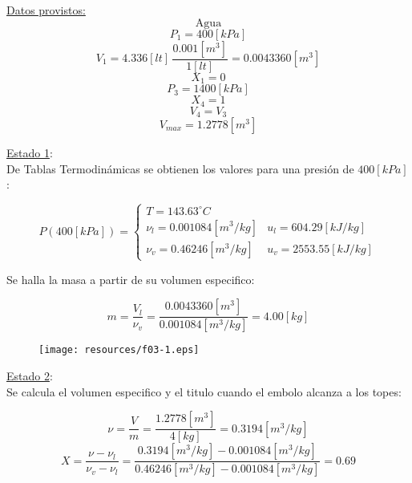 \documentclass[letter,11pt]{article}
\begin{document}
\begin{enumerate}
\underline{Datos provistos:}
\begin{equation*}
    \text{Agua}
\end{equation*}
\begin{equation*}
    P_1 = 400[kPa]
\end{equation*}
\begin{equation*}
    V_1 = 4.336[lt]\,\frac{0.001[m^3]}{1[lt]}=0.0043360[m^3]
\end{equation*}
\begin{equation*}
    X_1 = 0
\end{equation*}
\begin{equation*}
    P_3 = 1400[kPa]
\end{equation*}
\begin{equation*}
    X_4 = 1
\end{equation*}
\begin{equation*}
    V_4 = V_3
\end{equation*}
\begin{equation*}
    V_{max} = 1.2778[m^3]
\end{equation*}

\underline{Estado 1}: \\
De Tablas Termodinámicas se obtienen los valores para una presión de $400[kPa]$:

\begin{equation*}
    P(400[kPa]) = \begin{cases}
        T = 143.63^\circ C \\
        \nu_l = 0.001084[m^3/kg] & u_l = 604.29[kJ/kg] \\
        \nu_v = 0.46246[m^3/kg]  & u_v = 2553.55[kJ/kg]
    \end{cases}
\end{equation*}

Se halla la masa a partir de su volumen especifico:

\begin{equation*}
    m = \frac{V_l}{\nu_v} = \frac{0.0043360[m^3]}{0.001084[m^3/kg]}
      = 4.00[kg]
\end{equation*}

\begin{figure}[H]
\centering
\texttt{[image: resources/f03-1.eps]}
\end{figure}

\underline{Estado 2}: \\
Se calcula el volumen especifico y el titulo cuando el embolo alcanza a los
topes:

\begin{equation*}
    \nu = \frac{V}{m} = \frac{1.2778[m^3]}{4[kg]} = 0.3194[m^3/kg]
\end{equation*}
\begin{equation*}
    X = \frac{\nu-\nu_l}{\nu_v-\nu_l}
      = \frac{0.3194[m^3/kg] - 0.001084[m^3/kg]}
      {0.46246[m^3/kg] - 0.001084[m^3/kg]}
      = 0.69
\end{equation*}


\end{enumerate}
\end{document}
